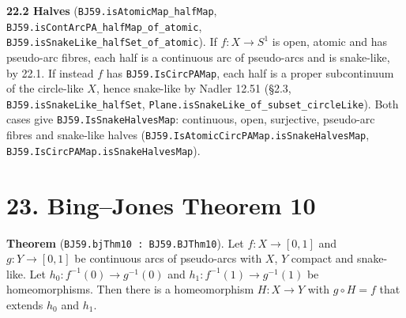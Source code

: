 \documentclass[11pt]{article}
\newcommand{\lean}[1]{\texttt{#1}}
\begin{document}
\textbf{22.2 Halves} (\lean{BJ59.\hspace{0pt}isAtomicMap\_\hspace{0pt}halfMap}, \lean{BJ59.\hspace{0pt}isContArcPA\_\hspace{0pt}halfMap\_\hspace{0pt}of\_\hspace{0pt}atomic}, \lean{BJ59.\hspace{0pt}isSnakeLike\_\hspace{0pt}halfSet\_\hspace{0pt}of\_\hspace{0pt}atomic}). If $f : X \to S^1$ is open, atomic and has pseudo-arc fibres, each half is a continuous arc of pseudo-arcs and is snake-like, by 22.1. If instead $f$ has \lean{BJ59.\hspace{0pt}IsCircPAMap}, each half is a proper subcontinuum of the circle-like $X$, hence snake-like by Nadler 12.51 (\S{}2.3, \lean{BJ59.\hspace{0pt}isSnakeLike\_\hspace{0pt}halfSet}, \lean{Plane.\hspace{0pt}isSnakeLike\_\hspace{0pt}of\_\hspace{0pt}subset\_\hspace{0pt}circleLike}). Both cases give \lean{BJ59.\hspace{0pt}IsSnakeHalvesMap}: continuous, open, surjective, pseudo-arc fibres and snake-like halves (\lean{BJ59.\hspace{0pt}IsAtomicCircPAMap.\hspace{0pt}isSnakeHalvesMap}, \lean{BJ59.\hspace{0pt}IsCircPAMap.\hspace{0pt}isSnakeHalvesMap}).

\section*{23. Bing--Jones Theorem 10}

\textbf{Theorem} (\lean{BJ59.\hspace{0pt}bjThm10 : BJ59.\hspace{0pt}BJThm10}). Let $f : X \to [0, 1]$ and $g : Y \to [0, 1]$ be continuous arcs of pseudo-arcs with $X$, $Y$ compact and snake-like. Let $h_0 : f^{-1}(0) \to g^{-1}(0)$ and $h_1 : f^{-1}(1) \to g^{-1}(1)$ be homeomorphisms. Then there is a homeomorphism $H : X \to Y$ with $g \circ H = f$ that extends $h_0$ and $h_1$.
\end{document}
